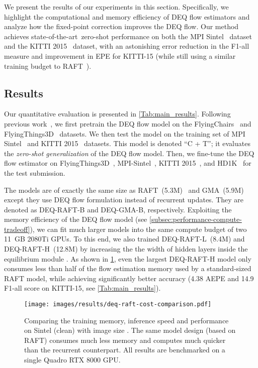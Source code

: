 \documentclass[10pt,twocolumn,letterpaper]{article}
\def\sota{state-of-the-art~}
\begin{document}
We present the results of our experiments in this section. Specifically, we highlight the computational and memory efficiency of DEQ flow estimators and analyze how the fixed-point correction improves the DEQ flow.
Our method achieves \sota zero-shot performance on both the MPI Sintel~\cite{sintel} dataset and the KITTI 2015~\cite{kitti} dataset, with an astonishing  error reduction in the F1-all measure and  improvement in EPE for KITTI-15 (while still using a similar training budget to RAFT~\cite{RAFT}).


\subsection{Results}
\label{sec:results}

Our quantitative evaluation is presented in \cref{Tab:main_results}.
Following previous work~\cite{RAFT,GMA}, we first pretrain the DEQ flow model on the FlyingChairs~\cite{flownet} and FlyingThings3D~\cite{mayer2016large} datasets. We then test the model on the training set of MPI Sintel~\cite{sintel} and KITTI 2015~\cite{kitti} datasets. This model is denoted ``C + T''; it evaluates the \textit{zero-shot generalization} of the DEQ flow model. 
Then, we fine-tune the DEQ flow estimator on FlyingThings3D~\cite{mayer2016large}, MPI-Sintel~\cite{sintel}, KITTI 2015~\cite{kitti}, and HD1K~\cite{hd1k} for the test submission.

The models are of exactly the same size as RAFT~(5.3M)~\citep{RAFT} and GMA~(5.9M)~\citep{GMA} except they use DEQ flow formulation instead of recurrent updates.
They are denoted as DEQ-RAFT-B and DEQ-GMA-B, respectively.
Exploiting the memory efficiency of the DEQ flow model (see \cref{subsec:performance-compute-tradeoff}), we can fit much larger models into the same compute budget of two 11~GB 2080Ti GPUs.
To this end, we also trained DEQ-RAFT-L~(8.4M) and DEQ-RAFT-H~(12.8M) by increasing the the width of hidden layers inside the equilibrium module .
As shown in \cref{fig:cost-comparison}, even the largest DEQ-RAFT-H model only consumes less than half of the flow estimation memory used by a standard-sized RAFT model, while achieving significantly better accuracy (4.38 AEPE and 14.9 F1-all score on KITTI-15, see \cref{Tab:main_results}).

\begin{figure}[t]
\centering
\texttt{[image: images/results/deq-raft-cost-comparison.pdf]}
\vspace{-.2cm}
\caption{Comparing the training memory, inference speed and performance on Sintel (clean) with image size . The same model design (based on RAFT) consumes much less memory and computes much quicker than the recurrent counterpart. All results are benchmarked on a single Quadro RTX 8000 GPU.}
\label{fig:cost-comparison}
\vspace{-.4cm}
\end{figure}
\end{document}
